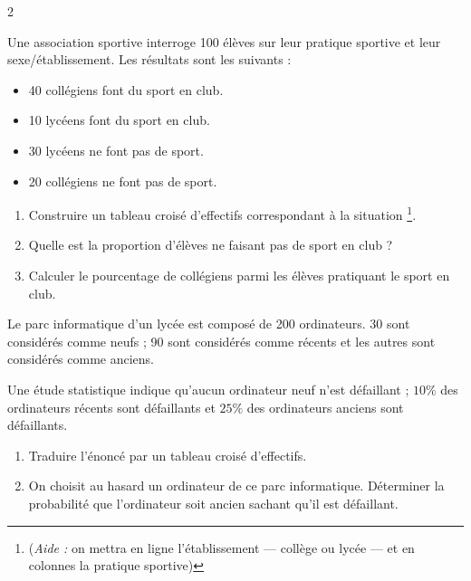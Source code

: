 \documentclass[a4paper,11pt]{article}
\begin{document}
\begin{multicols}{2}
\null\vfill

\begin{exercice}[title=Exercice 7 $\star$ { [Représenter, Calculer] }]{}{}
  Une association sportive interroge 100 élèves sur leur pratique sportive et leur sexe/établissement. Les résultats sont les suivants :
  \begin{itemize}[label=$\bullet$]
    \item 40 collégiens font du sport en club.
    \item 10 lycéens font du sport en club.
    \item 30 lycéens ne font pas de sport.
    \item 20 collégiens ne font pas de sport.
  \end{itemize}
  
  \begin{enumerate}
    \item Construire un tableau croisé d'effectifs correspondant à la situation \footnote{(\emph{Aide :} on mettra en ligne l'établissement — collège ou lycée — et en colonnes la pratique sportive)}.
    \item Quelle est la proportion d'élèves ne faisant pas de sport en club ?
    \item Calculer le pourcentage de collégiens parmi les élèves pratiquant le sport en club.
  \end{enumerate}
\end{exercice}


\newcolumn

\begin{exercice}[title=Exercice 8 $\star\star$ { [Représenter, Calculer] }]{}{}
  Le parc informatique d'un lycée est composé de 200 ordinateurs. 30 sont considérés comme neufs ; 90 sont considérés comme récents et les autres sont considérés comme anciens.
  
  Une étude statistique indique qu'aucun ordinateur neuf n'est défaillant ; $10\%$ des ordinateurs récents sont défaillants et $25\%$ des ordinateurs anciens sont défaillants.
  
  \begin{enumerate}
    \item Traduire l'énoncé par un tableau croisé d'effectifs.
    \item On choisit au hasard un ordinateur de ce parc informatique. Déterminer la probabilité que l'ordinateur soit ancien sachant qu'il est défaillant.
  \end{enumerate}
\end{exercice}



\end{multicols}
\end{document}
